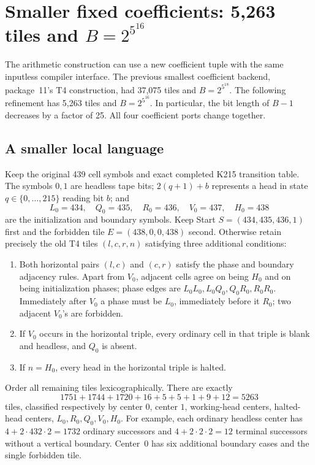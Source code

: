 \section{Smaller fixed coefficients: 5,263 tiles and $B=2^{5^{16}}$}
\label{sec:coefficient5263}

The arithmetic construction can use a new coefficient tuple with the same
inputless compiler interface.  The previous smallest coefficient backend,
package~11's T4 construction, had 37,075 tiles and $B=2^{5^{18}}$.
The following refinement has 5,263 tiles and $B=2^{5^{16}}$.
In particular, the bit length of $B-1$ decreases by a factor of 25.
All four coefficient ports change together.

\subsection{A smaller local language}
Keep the original 439 cell symbols and exact completed K215 transition
table.  The symbols $0,1$ are headless tape bits; $2(q+1)+b$ represents a
head in state $q\in\{0,\ldots,215\}$ reading bit $b$; and
\[
L_0=434,\quad Q_0=435,\quad R_0=436,\quad V_0=437,\quad H_0=438
\]
are the initialization and boundary symbols.  Keep Start
$S=(434,435,436,1)$ first and the forbidden tile
$E=(438,0,0,438)$ second.  Otherwise retain precisely the old T4 tiles
$(l,c,r,n)$ satisfying three additional conditions:
\begin{enumerate}
\item Both horizontal pairs $(l,c)$ and $(c,r)$ satisfy the phase and
boundary adjacency rules.  Apart from $V_0$, adjacent cells agree on
being $H_0$ and on being initialization phases; phase edges are
$L_0L_0,L_0Q_0,Q_0R_0,R_0R_0$.  Immediately after $V_0$ a phase must be
$L_0$, immediately before it $R_0$; two adjacent $V_0$'s are forbidden.
\item If $V_0$ occurs in the horizontal triple, every ordinary cell in
that triple is blank and headless, and $Q_0$ is absent.
\item If $n=H_0$, every head in the horizontal triple is halted.
\end{enumerate}
Order all remaining tiles lexicographically.  There are exactly
\[
1751+1744+1720+16+5+5+1+9+12=5263
\]
tiles, classified respectively by center $0$, center $1$, working-head
centers, halted-head centers, $L_0,R_0,Q_0,V_0,H_0$.
For example, each ordinary headless center has
$4+2\cdot432\cdot2=1732$ ordinary successors and
$4+2\cdot2\cdot2=12$ terminal successors without a vertical boundary.
Center~0 has six additional boundary cases and the single forbidden tile.

